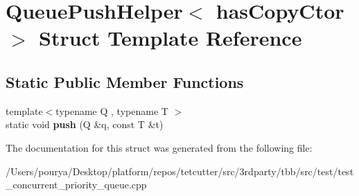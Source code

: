 \hypertarget{structQueuePushHelper}{}\section{Queue\+Push\+Helper$<$ has\+Copy\+Ctor $>$ Struct Template Reference}
\label{structQueuePushHelper}
\subsection*{Static Public Member Functions}
\begin{DoxyCompactItemize}
\item 
\hypertarget{structQueuePushHelper_ae10c93315ac258b157db819c133a2e82}{}{\footnotesize template$<$typename Q , typename T $>$ }\\static void {\bfseries push} (Q \&q, const T \&t)\label{structQueuePushHelper_ae10c93315ac258b157db819c133a2e82}

\end{DoxyCompactItemize}


The documentation for this struct was generated from the following file\+:\begin{DoxyCompactItemize}
\item 
/\+Users/pourya/\+Desktop/platform/repos/tetcutter/src/3rdparty/tbb/src/test/test\+\_\+concurrent\+\_\+priority\+\_\+queue.\+cpp\end{DoxyCompactItemize}
